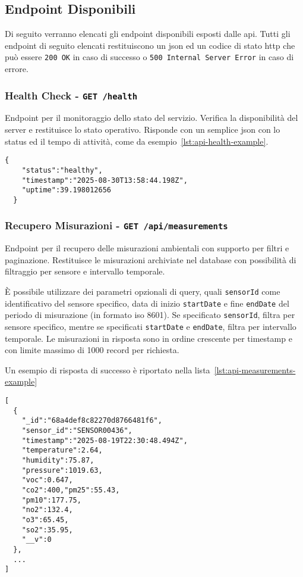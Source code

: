 \subsection{Endpoint Disponibili}

Di seguito verranno elencati gli endpoint disponibili esposti dalle \acrshort{api}.
Tutti gli endpoint di seguito elencati restituiscono un \acrshort{json} ed un codice di stato \acrshort{http} che può
essere \texttt{200 OK} in caso di successo o \texttt{500 Internal Server Error} in caso di errore.

\subsubsection{Health Check - \texttt{GET /health}}

Endpoint per il monitoraggio dello stato del servizio.
Verifica la disponibilità del server e restituisce lo stato operativo.
Risponde con un semplice \acrshort{json} con lo status ed il tempo di attività,
come da esempio~\ref{lst:api-health-example}.

\begin{lstlisting}[caption={Risposta di sucesso per endpoint \texttt{health}}, label=lst:api-health-example]
  {
    "status":"healthy",
    "timestamp":"2025-08-30T13:58:44.198Z",
    "uptime":39.198012656
  }
\end{lstlisting}

\subsubsection{Recupero Misurazioni - \texttt{GET /api/measurements}}

Endpoint per il recupero delle misurazioni ambientali con supporto per filtri e paginazione.
Restituisce le misurazioni archiviate nel database con possibilità di filtraggio per sensore e intervallo temporale.

È possibile utilizzare dei parametri opzionali di query, quali
\texttt{sensorId} come identificativo del sensore specifico,
data di inizio \texttt{startDate} e fine \texttt{endDate} del periodo di misurazione (in formato \acrshort{iso} 8601).
Se specificato \texttt{sensorId}, filtra per sensore specifico,
mentre se specificati \texttt{startDate} e \texttt{endDate}, filtra per intervallo temporale.
Le misurazioni in risposta sono in ordine crescente per timestamp e con limite massimo di 1000 record per richiesta.

Un esempio di risposta di successo è riportato nella lista~\ref{lst:api-measurements-example}
\begin{lstlisting}[caption={Risposta di sucesso per endpoint \texttt{measurements}},label=lst:api-measurements-example]
[
  {
    "_id":"68a4def8c82270d8766481f6",
    "sensor_id":"SENSOR00436",
    "timestamp":"2025-08-19T22:30:48.494Z",
    "temperature":2.64,
    "humidity":75.87,
    "pressure":1019.63,
    "voc":0.647,
    "co2":400,"pm25":55.43,
    "pm10":177.75,
    "no2":132.4,
    "o3":65.45,
    "so2":35.95,
    "__v":0
  },
  ...
]
\end{lstlisting}

